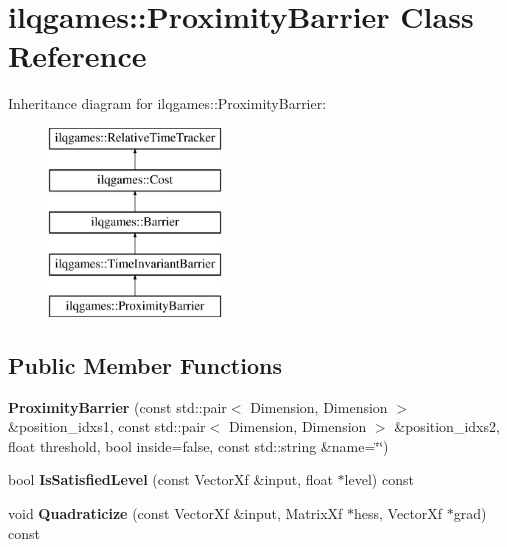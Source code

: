 \hypertarget{classilqgames_1_1_proximity_barrier}{}\section{ilqgames\+:\+:Proximity\+Barrier Class Reference}
\label{classilqgames_1_1_proximity_barrier}
Inheritance diagram for ilqgames\+:\+:Proximity\+Barrier\+:\begin{figure}[H]
\begin{center}
\leavevmode
\includegraphics[height=5.000000cm]{classilqgames_1_1_proximity_barrier}
\end{center}
\end{figure}
\subsection*{Public Member Functions}
\begin{DoxyCompactItemize}
\item 
{\bfseries Proximity\+Barrier} (const std\+::pair$<$ Dimension, Dimension $>$ \&position\+\_\+idxs1, const std\+::pair$<$ Dimension, Dimension $>$ \&position\+\_\+idxs2, float threshold, bool inside=false, const std\+::string \&name=\char`\"{}\char`\"{})\hypertarget{classilqgames_1_1_proximity_barrier_ae76b1eed67bc5aada8978be2aae0cf73}{}\label{classilqgames_1_1_proximity_barrier_ae76b1eed67bc5aada8978be2aae0cf73}

\item 
bool {\bfseries Is\+Satisfied\+Level} (const Vector\+Xf \&input, float $\ast$level) const \hypertarget{classilqgames_1_1_proximity_barrier_a722ce220dec85f21fbd0ef4c4d49f6ac}{}\label{classilqgames_1_1_proximity_barrier_a722ce220dec85f21fbd0ef4c4d49f6ac}

\item 
void {\bfseries Quadraticize} (const Vector\+Xf \&input, Matrix\+Xf $\ast$hess, Vector\+Xf $\ast$grad) const \hypertarget{classilqgames_1_1_proximity_barrier_a2563ad57a1624bd6e3da2afc7135f7ae}{}\label{classilqgames_1_1_proximity_barrier_a2563ad57a1624bd6e3da2afc7135f7ae}

\end{DoxyCompactItemize}
